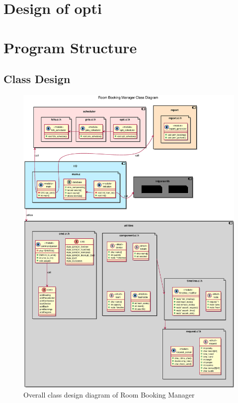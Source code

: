 \documentclass{article}
\begin{document}
    \section{Design of opti}

    \cleardoublepage
    \section{Program Structure}
        \subsection{Class Design}
            \begin{figure}[!htbp]
                \centering
                \includegraphics[scale=0.4]{./img/eps/class_diagram.eps}
                \caption{Overall class design diagram of Room Booking Manager}
            \end{figure}
\end{document}
